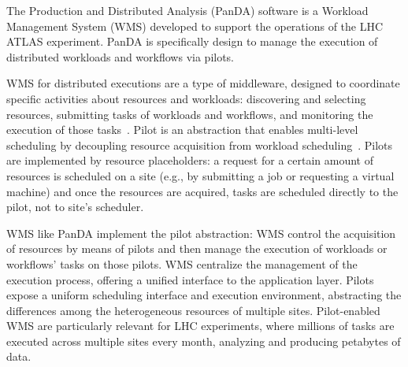 

The Production and Distributed Analysis (PanDA) software is a Workload
Management System (WMS) developed to support the operations of the LHC ATLAS
experiment. PanDA is specifically design to manage the execution of distributed
workloads and workflows via pilots.

WMS for distributed executions are a type of middleware, designed to coordinate
specific activities about resources and workloads: discovering and selecting
resources, submitting tasks of workloads and workflows, and monitoring the
execution of those tasks~\cite{marco2009glite}. Pilot is an abstraction that
enables multi-level scheduling by decoupling resource acquisition from workload
scheduling~\cite{turilli2015comprehensive}. Pilots are implemented by resource
placeholders: a request for a certain amount of resources is scheduled on a site
(e.g., by submitting a job or requesting a virtual machine) and once the
resources are acquired, tasks are scheduled directly to the pilot, not to site's
scheduler.

WMS like PanDA implement the pilot abstraction: WMS control the acquisition of
resources by means of pilots and then manage the execution of workloads or
workflows' tasks on those pilots. WMS centralize the management of the execution
process, offering a unified interface to the application layer. Pilots expose a
uniform scheduling interface and execution environment, abstracting the
differences among the heterogeneous resources of multiple sites. Pilot-enabled
WMS are particularly relevant for LHC experiments, where millions of tasks are
executed across multiple sites every month, analyzing and producing petabytes of
data.

